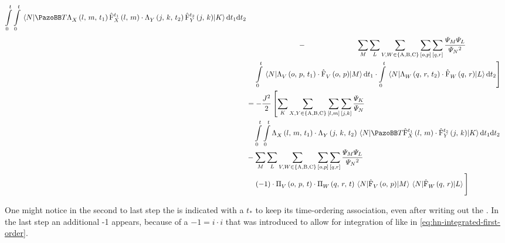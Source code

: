 \begin{equation}
\begin{split}
        \int\limits_0^t \int\limits_0^t        \bracketHelper{N}{\timeOrderingOperator
        \VhamiltonianAnalyticalPart{$X$}{l}{m}{t_1} \VhamiltonianOperatorPart[t_1]{$X$}{l}{m}
        \cdot 
        \VhamiltonianAnalyticalPart{$Y$}{j}{k}{t_2} \VhamiltonianOperatorPart[t_2]{$Y$}{j}{k}
        }{K}            \mathrm{d}t_1\mathrm{d}t_2 \\
        &\stackrel{\phantom{\ref{eq:interaction-picture-v-ham-full}}}{-} 
        \lsum[M]\lsum[L]\lsum[V,W \in \left\{\text{A}, \text{B}, \text{C}\right\}]
        \fullneighborsum{o}{p}\fullneighborsum{q}{r}
        \frac{\psiN[M]\psiN[L]}{\psiN{}^2}\\&\quad
        \left.
        \int\limits_0^t \bracketHelper{N}{\VhamiltonianAnalyticalPart{$V$}{o}{p}{t_1} \cdot \VhamiltonianOperatorPart{$V$}{o}{p}}{M}  \mathrm{d}t_1
        \cdot
        \int\limits_0^t \bracketHelper{N}{\VhamiltonianAnalyticalPart{$W$}{q}{r}{t_2} \cdot \VhamiltonianOperatorPart{$W$}{q}{r}}{L}  \mathrm{d}t_2 \right]\\
        &=
        - \frac{J^2}{2} \left[ 
        \lsum[K]\lsum[X,Y \in \left\{\text{A}, \text{B}, \text{C}\right\}] \fullneighborsum{l}{m}\fullneighborsum{j}{k}
        \frac{\psiN[K]}{\psiN} 
        \right.
        \\&\quad
        \int\limits_0^t \int\limits_0^t  
        \VhamiltonianAnalyticalPart{$X$}{l}{m}{t_1}
        \cdot 
        \VhamiltonianAnalyticalPart{$Y$}{j}{k}{t_2}
        \bracketHelper{N}{\timeOrderingOperator
            \VhamiltonianOperatorPart[t_1]{$X$}{l}{m}
        \cdot 
            \VhamiltonianOperatorPart[t_2]{$Y$}{j}{k}
        }{K}            \mathrm{d}t_1\mathrm{d}t_2 \\
        & - 
        \lsum[M]\lsum[L]\lsum[V,W \in \left\{\text{A}, \text{B}, \text{C}\right\}]
        \fullneighborsum{o}{p}\fullneighborsum{q}{r}
        \frac{\psiN[M]\psiN[L]}{\psiN{}^2}\\&\quad
        \left.
            (-1) \cdot \VhamiltonianAnalyticalPartIntegrated{$V$}{o}{p}{t} 
            \cdot
            \VhamiltonianAnalyticalPartIntegrated{$W$}{q}{r}{t}
            \bracketHelper{N}{\VhamiltonianOperatorPart{$V$}{o}{p}}{M}
            \bracketHelper{N}{\VhamiltonianOperatorPart{$W$}{q}{r}}{L}
            \vphantom{
                \lsum[M]
            }
        \right]
    \end{split}
\end{equation}

One might notice in the second to last step the \VhamiltonianOperatorPart[t_\ast]{$\ast$}{\ast}{\ast} is indicated with a $t_\ast$ to keep its time-ordering association, even after writing out the .
In the last step an additional -1 appears, because of a $-1 = i \cdot i$ that was introduced to allow for integration of  like in \autoref{eq:hn-integrated-first-order}.


